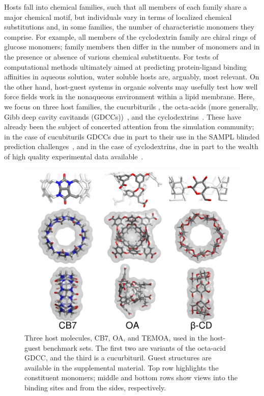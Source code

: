 \documentclass[aps,pre,twocolumn,nofootinbib,superscriptaddress,10pt, final,tightenlines]{revtex4-1}
\begin{document}
Hosts fall into chemical families, such that all members of each family share a major chemical motif, but individuals vary in terms of localized chemical substitutions and, in some families, the number of characteristic monomers they comprise.  
For example, all members of the cyclodextrin family are chiral rings of glucose monomers; family members then differ in the number of monomers and in the presence or absence of various chemical substituents. 
For tests of computational methods ultimately aimed at predicting protein-ligand binding affinities in aqueous solution, water soluble hosts are, arguably, most relevant. 
On the other hand, host-guest systems in organic solvents may usefully test how well force fields work in the nonaqueous environment within a lipid membrane. 
Here, we focus on three host families, the cucurbiturils \cite{freeman_cucurbituril_1981,mock_host-guest_1983}, the octa-acids (more generally, Gibb deep cavity cavitands (GDCCs))~\cite{gibb_well-defined_2004, hillyer_synthesis_2016}, and the cyclodextrins~\cite{rekharsky_complexation_1998}. 
These have already been the subject of concerted attention from the simulation community; in the case of cucubiturils GDCCs due in part to their use in the SAMPL blinded prediction challenges~\cite{muddana_sampl3_2012, muddana_sampl4_2014, yin_overview_2016}, and in the case of cyclodextrins, due in part to the wealth of high quality experimental data available~\cite{rekharsky_complexation_1998, Wickstrom:2013:J.Chem.TheoryComput., henriksen_evaluating_2017}.  

\begin{figure}
\includegraphics[width=\textwidth]{figures/hosts-CB7-OA-bCD.pdf}
\caption{\label{hosts}
Three host molecules, CB7, OA, and TEMOA, used in the host-guest benchmark sets.
The first two are variants of the octa-acid GDCC, and the third is a cucurbituril.
Guest structures are available in the supplemental material.
Top row highlights the constituent monomers; middle and bottom rows show views into the binding sites and from the sides, respectively.
}
\end{figure}
\end{document}
